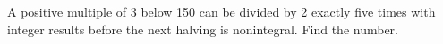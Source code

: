 A positive multiple of 3 below 150 can be divided by 2 exactly five times with integer results before the next halving is nonintegral. Find the number.
